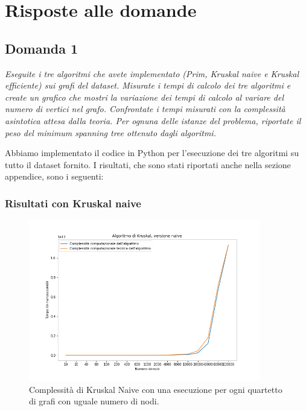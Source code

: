 \section{Risposte alle domande}

\subsection{Domanda 1}

\textit{Eseguite i tre algoritmi che avete implementato (Prim, Kruskal naive e
Kruskal efficiente) sui grafi del dataset. Misurate i tempi di calcolo dei tre algoritmi e
create un grafico che mostri la variazione dei tempi di calcolo al variare del numero di
vertici nel grafo. Confrontate i tempi misurati con la complessità asintotica attesa dalla
teoria. Per ognuna delle istanze del problema, riportate il peso del minimum spanning tree
ottenuto dagli algoritmi.}

Abbiamo implementato il codice in Python per l'esecuzione dei tre algoritmi su tutto il dataset fornito. I risultati, che sono stati riportati anche nella sezione appendice, sono i seguenti:

\subsubsection{Risultati con Kruskal naive}


\begin{figure}[H]
	\centering
	\includegraphics[width=0.9\textwidth]{res/images/graph-no-rep/kruskal_naive_senza_ripetizioni.png}
    \caption{Complessità di Kruskal Naive con una esecuzione per ogni quartetto di grafi con uguale numero di nodi.}
	\label{fig:kruskalnr}
\end{figure}

